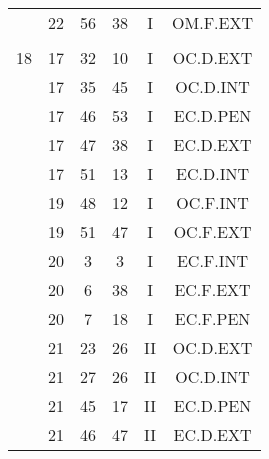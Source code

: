 \documentclass[12pt, a4paper]{article}
\begin{document}
\begin{multicols}{3}
{\begin{tabular}{c c c c c c}
	 	 	 	 & 22 & 56 & 38 & I & OM.F.EXT\\%
	 	 	 	 & & & & & \\%
	 	 	 	18 & 17 & 32 & 10 & I & OC.D.EXT\\%
	 	 	 	 & 17 & 35 & 45 & I & OC.D.INT\\%
	 	 	 	 & 17 & 46 & 53 & I & EC.D.PEN\\%
	 	 	 	 & 17 & 47 & 38 & I & EC.D.EXT\\%
	 	 	 	 & 17 & 51 & 13 & I & EC.D.INT\\%
	 	 	 	 & 19 & 48 & 12 & I & OC.F.INT\\%
	 	 	 	 & 19 & 51 & 47 & I & OC.F.EXT\\%
	 	 	 	 & 20 & 3 & 3 & I & EC.F.INT\\%
	 	 	 	 & 20 & 6 & 38 & I & EC.F.EXT\\%
	 	 	 	 & 20 & 7 & 18 & I & EC.F.PEN\\%
	 	 	 	 & 21 & 23 & 26 & II & OC.D.EXT\\%
	 	 	 	 & 21 & 27 & 26 & II & OC.D.INT\\%
	 	 	 	 & 21 & 45 & 17 & II & EC.D.PEN\\%
	 	 	 	 & 21 & 46 & 47 & II & EC.D.EXT\\%
	 	 \end{tabular}
 	}
\end{multicols}
\end{document}

